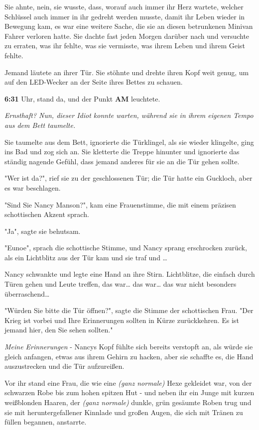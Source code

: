 {Sie ahnte, nein, sie wusste, dass, worauf auch immer ihr Herz wartete, welcher Schlüssel auch immer in ihr gedreht werden musste, damit ihr Leben wieder in Bewegung kam, es war eine weitere Sache, die sie an diesen betrunkenen Minivan Fahrer verloren hatte. Sie dachte fast jeden Morgen darüber nach und versuchte zu erraten, was ihr fehlte, was sie vermisste, was ihrem Leben und ihrem Geist fehlte.

Jemand läutete an ihrer Tür. Sie stöhnte und drehte ihren Kopf weit genug, um auf den LED-Wecker an der Seite ihres Bettes zu schauen.

\textbf{6:31} Uhr, stand da, und der Punkt \textbf{AM} leuchtete.

\emph{Ernsthaft? Nun, dieser Idiot konnte warten, während sie in ihrem eigenen Tempo aus dem Bett taumelte.}

Sie taumelte aus dem Bett, ignorierte die Türklingel, als sie wieder klingelte, ging ins Bad und zog sich an. Sie kletterte die Treppe hinunter und ignorierte das ständig nagende Gefühl, dass jemand anderes für sie an die Tür gehen sollte.

"Wer ist da?", rief sie zu der geschlossenen Tür; die Tür hatte ein Guckloch, aber es war beschlagen.

"Sind Sie Nancy Manson?", kam eine Frauenstimme, die mit einem präzisen schottischen Akzent sprach.

"Ja", sagte sie behutsam.

"Eunoe", sprach die schottische Stimme, und Nancy sprang erschrocken zurück, als ein Lichtblitz aus der Tür kam und sie traf und …

Nancy schwankte und legte eine Hand an ihre Stirn. Lichtblitze, die einfach durch Türen gehen und Leute treffen, das war… das war… das war nicht besonders überraschend…

"Würden Sie bitte die Tür öffnen?", sagte die Stimme der schottischen Frau. "Der Krieg ist vorbei und Ihre Erinnerungen sollten in Kürze zurückkehren. Es ist jemand hier, den Sie sehen sollten."

\emph{Meine Erinnerungen} - Nancys Kopf fühlte sich bereits verstopft an, als würde sie gleich anfangen, etwas aus ihrem Gehirn zu hacken, aber sie schaffte es, die Hand auszustrecken und die Tür aufzureißen.

Vor ihr stand eine Frau, die wie eine \emph{(ganz normale)} Hexe gekleidet war, von der schwarzen Robe bis zum hohen spitzen Hut - und neben ihr ein Junge mit kurzen weißblonden Haaren, der \emph{(ganz normale)} dunkle, grün gesäumte Roben trug und sie mit heruntergefallener Kinnlade und großen Augen, die sich mit Tränen zu füllen begannen, anstarrte.

}
